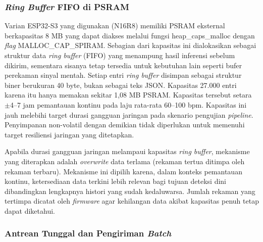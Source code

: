 \subsubsection{\textit{Ring Buffer} FIFO di PSRAM}

Varian ESP32-S3 yang digunakan (N16R8) memiliki PSRAM eksternal berkapasitas 8 MB
yang dapat diakses melalui fungsi heap\_caps\_malloc dengan \textit{flag} MALLOC\_CAP\_SPIRAM.
Sebagian dari kapasitas ini dialokasikan sebagai struktur data
\textit{ring buffer} (FIFO) yang menampung hasil inferensi sebelum dikirim, sementara
sisanya tetap tersedia untuk kebutuhan lain seperti bufer perekaman sinyal mentah.
Setiap entri \textit{ring buffer} disimpan sebagai struktur biner berukuran 40 byte,
bukan sebagai teks JSON. Kapasitas 27.000 entri karena itu hanya memakan sekitar 1,08 MB
PSRAM. Kapasitas tersebut setara $\pm$4--7 jam pemantauan kontinu pada laju rata-rata
60--100 bpm.
Kapasitas ini jauh melebihi target durasi gangguan jaringan pada skenario
pengujian \textit{pipeline}. Penyimpanan
non-volatil dengan demikian tidak diperlukan untuk memenuhi target resiliensi jaringan yang ditetapkan.

Apabila durasi gangguan jaringan melampaui kapasitas \textit{ring buffer}, mekanisme
yang diterapkan adalah \textit{overwrite} data terlama (rekaman tertua ditimpa oleh
rekaman terbaru). Mekanisme ini dipilih karena, dalam konteks pemantauan kontinu,
ketersediaan data terkini lebih relevan bagi tujuan deteksi dini dibandingkan lengkapnya
histori yang sudah kedaluwarsa. Jumlah rekaman yang tertimpa dicatat oleh \textit{firmware}
agar kehilangan data akibat kapasitas penuh tetap dapat diketahui.

\subsubsection{Antrean Tunggal dan Pengiriman \textit{Batch}}

